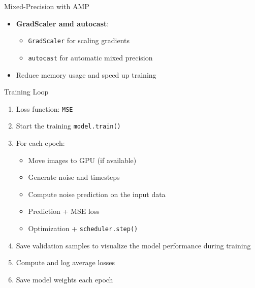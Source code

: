 \begin{frame}{Mixed-Precision with AMP}
    \begin{itemize}
        \item \textbf{GradScaler amd autocast}:
              \begin{itemize}
                  \item \texttt{GradScaler} for scaling gradients
                  \item \texttt{autocast} for automatic mixed precision
              \end{itemize}
        \item Reduce memory usage and speed up training
    \end{itemize}
\end{frame}

\begin{frame}{Training Loop}
    \begin{enumerate}
        \item Loss function: \texttt{MSE}
        \item Start the training \texttt{model.train()}
        \item For each epoch:
              \begin{itemize}
                  \item Move images to GPU (if available)
                  \item Generate noise and timesteps
                  \item Compute noise prediction on the input data
                  \item Prediction + MSE loss
                  \item Optimization + \texttt{scheduler.step()}
              \end{itemize}
        \item Save validation samples to visualize the model performance during training
        \item Compute and log average losses
        \item Save model weights each epoch
    \end{enumerate}
\end{frame}

